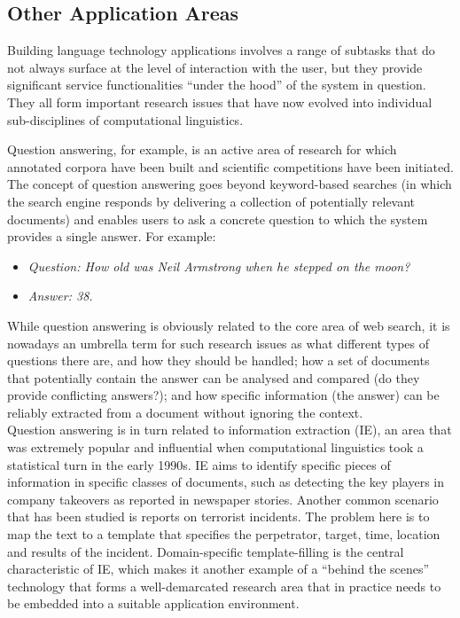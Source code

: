 \begin{multicols}{2}
\subsection{Other Application Areas}

Building language technology applications involves a range of subtasks that do
not always surface at the level of interaction with the user, but they provide
significant service functionalities “under the hood” of the system in question.
They all form important research issues that have now evolved into individual
sub-disciplines of computational linguistics.

Question answering, for example, is an active area of research for which
annotated corpora have been built and scientific competitions have been
initiated. The concept of question answering goes beyond keyword-based searches
(in which the search engine responds by delivering a collection of potentially
relevant documents) and enables users to ask a concrete question to which the
system provides a single answer. For example:
\begin{itemize}
\item[] \textit{Question: How old was Neil Armstrong when he stepped on the
              moon?}

\item[] \textit{Answer: 38.}
\end{itemize}
While question answering is obviously related to the core area of web search,
it is nowadays an umbrella term for such research issues as what different
types of questions there are, and how they should be handled; how a set of
documents that potentially contain the answer can be analysed and compared (do
they provide conflicting answers?); and how specific information (the answer)
can be reliably extracted from a document without ignoring the context.\\
Question answering is in turn related to information extraction (IE), an area that was
extremely popular and influential when computational linguistics took a
statistical turn in the early 1990s. IE aims to identify specific pieces of
information in specific classes of documents, such as detecting the key players
in company takeovers as reported in newspaper stories. Another common scenario
that has been studied is reports on terrorist incidents. The problem here is to
map the text to a template that specifies the perpetrator, target, time,
location and results of the incident. Domain-specific template-filling is the
central characteristic of IE, which makes it another example of a “behind the
scenes” technology that forms a well-demarcated research area that in practice
needs to be embedded into a suitable application environment.


\end{multicols}
